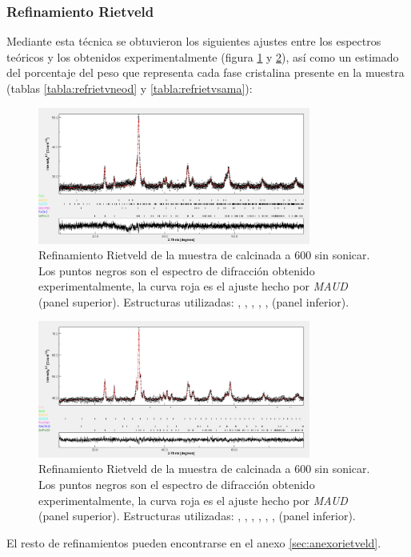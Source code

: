 \documentclass[../main.tex]{subfiles}
\begin{document}
\subsubsection{Refinamiento Rietveld} \label{sec:resrietlveld}
Mediante esta técnica se obtuvieron los siguientes ajustes entre los espectros teóricos y los obtenidos experimentalmente (figura \ref{fig:rietveld600ndresultados} y \ref{fig:rietveld700smresultados}), así como un estimado del porcentaje del peso que representa cada fase cristalina presente en la muestra (tablas \ref{tabla:refrietvneod} y \ref{tabla:refrietvsama}):
\begin{figure}[H]
    \centering
    \includegraphics[width=0.8\textwidth]{fig/DRX600NdFeO3.png}
    \caption{Refinamiento Rietveld de la muestra de \neod{} calcinada a 600\gradoC{} sin sonicar. Los puntos negros son el espectro de difracción obtenido experimentalmente, la curva roja es el ajuste hecho por \textit{MAUD} (panel superior). Estructuras utilizadas: \neod{} \cite{ndfeo3},  \cite{ndoh3},  \cite{feoh2},  \cite{nd2o3},  \cite{fe2o3},  \cite{feo} (panel inferior).}
    \label{fig:rietveld600ndresultados}
\end{figure}
\begin{figure}[H]
    \centering
    \includegraphics[width=0.8\textwidth]{fig/DRX700SmFeO3.png}
    \caption{Refinamiento Rietveld de la muestra de \neod{} calcinada a 600\gradoC{} sin sonicar. Los puntos negros son el espectro de difracción obtenido experimentalmente, la curva roja es el ajuste hecho por \textit{MAUD} (panel superior). Estructuras utilizadas: \sama{} \cite{smfeo3},  \cite{smoh3},  \cite{feoh2},  \cite{sm2o3},  \cite{fe2o3},  \cite{smo},  \cite{feo} (panel inferior).}
    \label{fig:rietveld700smresultados}
\end{figure}
El resto de refinamientos pueden encontrarse en el anexo \ref{sec:anexorietveld}.
\end{document}
